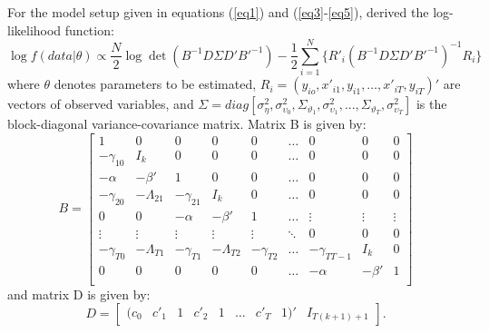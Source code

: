 \documentclass[a4paper]{article}
\begin{document}
\indent For the model setup given in equations (\ref{eq1}) and (\ref{eq3}-\ref{eq5}), \citet{Moral+2013} derived the log-likelihood function:
\begin{equation}\label{eq6}
    \log f(data|\theta) \propto \frac{N}{2}\log\det(B^{-1}D\Sigma D'B'^{-1})-\frac{1}{2}\sum_{i=1}^{N}\{R'_{i}(B^{-1}D\Sigma D'B'^{-1})^{-1}R_{i}\}
\end{equation}
\noindent where $\theta$ denotes parameters to be estimated, $R_{i}=(y_{io},x'_{i1},y_{i1},\dots,x'_{iT},y_{iT})'$ are vectors of observed variables, and $\Sigma=diag[\sigma^{2}_{\eta},\sigma^{2}_{\upsilon_{0}},\Sigma_{\vartheta_{1}},\sigma^{2}_{\upsilon_{1}},...,\Sigma_{\vartheta_{T}},\sigma^{2}_{\upsilon_{T}}]$ is the block-diagonal variance-covariance matrix.
Matrix B is given by:
\begin{equation}\label{eq7}
B=\begin{bmatrix}
 1&0&0&0&0&\dotsc& 0&0&0\\
 -\gamma_{10}&I_{k}&0&0&0&\dotsc&0&0&0\\
 -\alpha&-\beta'&1&0&0&\dotsc&0&0&0\\
 -\gamma_{20}&-\Lambda_{21}&-\gamma_{21}&I_{k}&0&\dotsc&0&0&0\\
0&0&-\alpha&-\beta'&1&\dotsc&\vdots&\vdots&\vdots\\
\vdots&\vdots&\vdots&\vdots&\vdots&\ddots&0&0&0\\
 -\gamma_{T0}&-\Lambda_{T1}&-\gamma_{T1}&-\Lambda_{T2}&-\gamma_{T2}&\dotsc&-\gamma_{TT-1}&I_{k}&0\\
 0&0&0&0&0&\dotsc&-\alpha&-\beta'&1\\
\end{bmatrix}
\end{equation}
and matrix D is given by:
\begin{equation}\label{eq8}
D=\begin{bmatrix}
(c_{0}&c'_{1}&1&c'_{2}&1&\dotsc&c'_{T}&1)' & I_{T(k+1) + 1}
 \end{bmatrix}.
\end{equation}
\end{document}
